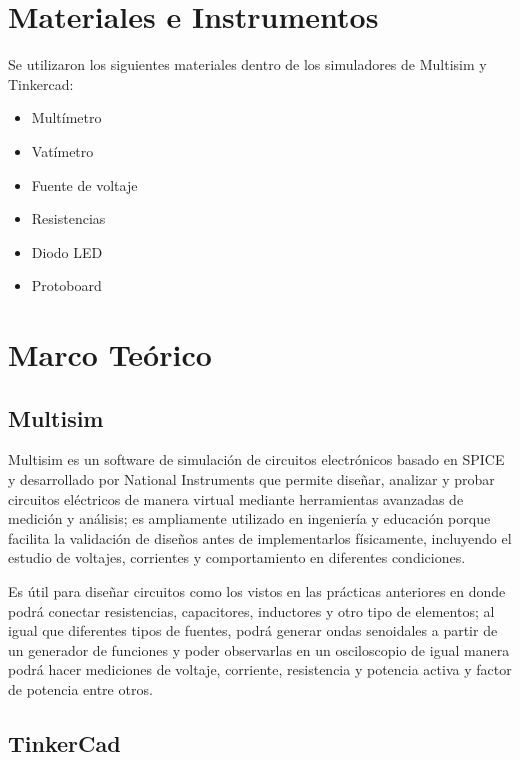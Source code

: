\documentclass{article}
\begin{document}
    \section{Materiales e Instrumentos}

    Se utilizaron los siguientes materiales dentro de los simuladores de Multisim y Tinkercad:

    \begin{itemize}
        \item Multímetro
        \item Vatímetro
        \item Fuente de voltaje
        \item Resistencias
        \item Diodo LED
        \item Protoboard
    \end{itemize}

    \section{Marco Teórico}

    \subsection{Multisim}


    Multisim es un software de simulación de circuitos electrónicos basado en SPICE y desarrollado por National Instruments que permite diseñar, analizar y probar circuitos eléctricos de manera virtual mediante herramientas avanzadas de medición y análisis; es ampliamente utilizado en ingeniería y educación porque facilita la validación de diseños antes de implementarlos físicamente, incluyendo el estudio de voltajes, corrientes y comportamiento en diferentes condiciones.

    Es útil para diseñar circuitos como los vistos en las prácticas anteriores en donde podrá conectar resistencias, capacitores, inductores y otro tipo de elementos; al igual que diferentes tipos de fuentes, podrá generar ondas senoidales a partir de un generador de funciones y poder observarlas en un osciloscopio de igual manera podrá hacer mediciones de voltaje, corriente, resistencia y potencia activa y factor de potencia entre otros.

    \subsection{TinkerCad}
\end{document}
